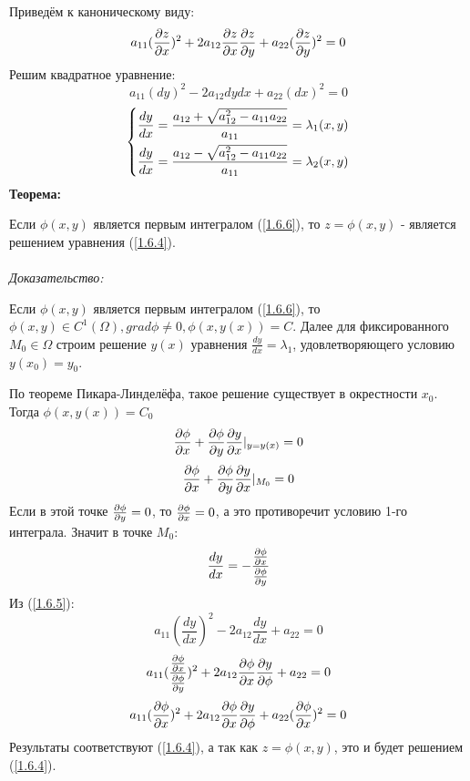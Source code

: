 \documentclass[../main.tex]{subfiles}
\begin{document}
	Приведём к каноническому виду:
	\begin{equation}\label{1.6.4}
		a_{11}(\frac{\partial z}{\partial x})^2+2a_{12}\frac{\partial z}{\partial x}\frac{\partial z}{\partial y}+a_{22}(\frac{\partial z}{\partial y})^2=0
	\end{equation}
	Решим квадратное уравнение:
	\begin{equation}\label{1.6.5}
		a_{11}(dy)^2-2a_{12}dydx+a_{22}(dx)^2=0
	\end{equation}
	\begin{equation}\label{1.6.6}
		\begin{dcases}
			\frac{dy}{dx} = \frac{a_{12}+\sqrt{a_{12}^2-a_{11}a_{22}}}{a_{11}}=\lambda_1(x,y) \\
			\frac{dy}{dx} = \frac{a_{12}-\sqrt{a_{12}^2-a_{11}a_{22}}}{a_{11}}=\lambda_2(x,y)
		\end{dcases}
	\end{equation}
	\textbf{Теорема:}\\
	\par Если $\phi(x,y)$ является первым интегралом (\ref{1.6.6}), то $z=\phi(x,y)$ - является решением уравнения (\ref{1.6.4}). \\ \\
	\textit{Доказательство:}\\
	\par Если $\phi(x,y)$ является первым интегралом (\ref{1.6.6}), то $\phi(x,y) \in C^1(\Omega), grad\phi \ne 0, \phi(x,y(x))=C$. Далее для фиксированного $M_0\in\Omega$ строим решение $y(x)$ уравнения $\frac{dy}{dx}=\lambda_1$, удовлетворяющего условию $y(x_0)=y_0$.\\
	\par По теореме Пикара-Линделёфа, такое решение существует в окрестности $x_0$. Тогда $\phi(x,y(x))=C_0$
	$$\frac{\partial \phi}{\partial x}+\frac{\partial \phi}{\partial y}\frac{\partial y}{\partial x}|_{y=y(x)}=0$$
	$$\frac{\partial \phi}{\partial x}+\frac{\partial \phi}{\partial y}\frac{\partial y}{\partial x}|_{M_0}=0$$
	Если в этой точке $\frac{\partial \phi}{\partial y}=0$, то $\frac{\partial \phi}{\partial x}=0$, а это противоречит условию 1-го интеграла. Значит в точке $M_0$:
	$$\frac{dy}{dx}=-\frac{\frac{\partial \phi}{\partial x}}{\frac{\partial \phi}{\partial y}}$$
	Из (\ref{1.6.5}):
	$$ a_{11}(\frac{dy}{dx})^2-2a_{12}\frac{dy}{dx}+a_{22}=0$$
	$$ a_{11}(\frac{\frac{\partial \phi}{\partial x}}{\frac{\partial \phi}{\partial y}})^2+2a_{12}\frac{\partial \phi}{\partial x}\frac{\partial y}{\partial \phi}+a_{22}=0$$
	$$ a_{11}(\frac{\partial \phi}{\partial x})^2+2a_{12}\frac{\partial \phi}{\partial x}\frac{\partial y}{\partial \phi}+a_{22}(\frac{\partial \phi}{\partial x})^2=0$$
	Результаты соответствуют (\ref{1.6.4}), а так как $z = \phi(x,y)$, это и будет решением (\ref{1.6.4}).
\end{document}
